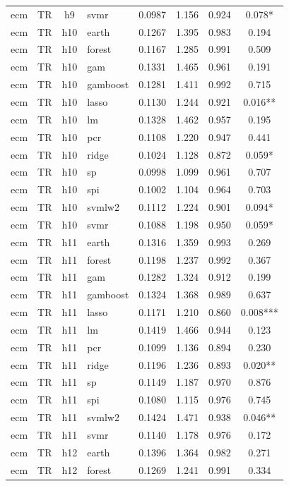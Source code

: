 \begin{ThreePartTable}
\begin{longtable}[t]{llclcccc}
ecm & TR & h9 & svmr & 0.0987 & 1.156 & 0.924 & 0.078*\\
\addlinespace
ecm & TR & h10 & earth & 0.1267 & 1.395 & 0.983 & 0.194\\
ecm & TR & h10 & forest & 0.1167 & 1.285 & 0.991 & 0.509\\
ecm & TR & h10 & gam & 0.1331 & 1.465 & 0.961 & 0.191\\
ecm & TR & h10 & gamboost & 0.1281 & 1.411 & 0.992 & 0.715\\
ecm & TR & h10 & lasso & 0.1130 & 1.244 & 0.921 & 0.016**\\
ecm & TR & h10 & lm & 0.1328 & 1.462 & 0.957 & 0.195\\
ecm & TR & h10 & pcr & 0.1108 & 1.220 & 0.947 & 0.441\\
ecm & TR & h10 & ridge & 0.1024 & 1.128 & 0.872 & 0.059*\\
ecm & TR & h10 & sp & 0.0998 & 1.099 & 0.961 & 0.707\\
ecm & TR & h10 & spi & 0.1002 & 1.104 & 0.964 & 0.703\\
ecm & TR & h10 & svmlw2 & 0.1112 & 1.224 & 0.901 & 0.094*\\
ecm & TR & h10 & svmr & 0.1088 & 1.198 & 0.950 & 0.059*\\
\addlinespace
ecm & TR & h11 & earth & 0.1316 & 1.359 & 0.993 & 0.269\\
ecm & TR & h11 & forest & 0.1198 & 1.237 & 0.992 & 0.367\\
ecm & TR & h11 & gam & 0.1282 & 1.324 & 0.912 & 0.199\\
ecm & TR & h11 & gamboost & 0.1324 & 1.368 & 0.989 & 0.637\\
ecm & TR & h11 & lasso & 0.1171 & 1.210 & 0.860 & 0.008***\\
ecm & TR & h11 & lm & 0.1419 & 1.466 & 0.944 & 0.123\\
ecm & TR & h11 & pcr & 0.1099 & 1.136 & 0.894 & 0.230\\
ecm & TR & h11 & ridge & 0.1196 & 1.236 & 0.893 & 0.020**\\
ecm & TR & h11 & sp & 0.1149 & 1.187 & 0.970 & 0.876\\
ecm & TR & h11 & spi & 0.1080 & 1.115 & 0.976 & 0.745\\
ecm & TR & h11 & svmlw2 & 0.1424 & 1.471 & 0.938 & 0.046**\\
ecm & TR & h11 & svmr & 0.1140 & 1.178 & 0.976 & 0.172\\
\addlinespace
ecm & TR & h12 & earth & 0.1396 & 1.364 & 0.982 & 0.271\\
ecm & TR & h12 & forest & 0.1269 & 1.241 & 0.991 & 0.334\\

\end{longtable}
\end{ThreePartTable}
